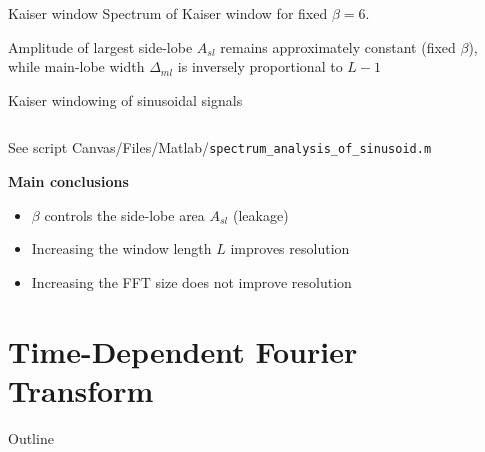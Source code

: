 \documentclass[10pt]{beamer}
\begin{document}
%
\begin{frame}{Kaiser window}
Spectrum of Kaiser window for fixed $\beta = 6$.

Amplitude of largest side-lobe $A_{sl}$ remains approximately constant (fixed $\beta$), while main-lobe width $\Delta_{ml}$ is inversely proportional to $L-1$

\begin{center}
	\resizebox{0.7\textwidth}{!}{}
\end{center}

\end{frame}

%
\begin{frame}{Kaiser windowing of sinusoidal signals}

\begin{columns}
	\begin{column}{0.5\textwidth}
		\begin{center}
			\def\BETA{1}
			\resizebox{\textwidth}{!}{}
		\end{center}
	\end{column}
	\begin{column}{0.5\textwidth}
		\begin{center}
			\resizebox{\textwidth}{!}{}
		\end{center}
	\end{column}
\end{columns}

See script Canvas/Files/Matlab/\texttt{spectrum\_analysis\_of\_sinusoid.m}

\textbf{Main conclusions}
\begin{itemize}
	\item $\beta$ controls the side-lobe area $A_{sl}$ (leakage)
	\item Increasing the window length $L$ improves resolution
	\item Increasing the FFT size does not improve resolution
\end{itemize}

\end{frame}

%
\section{Time-Dependent Fourier Transform}
\begin{frame}{Outline}
\tableofcontents[currentsection]
\end{frame}
\end{document}
